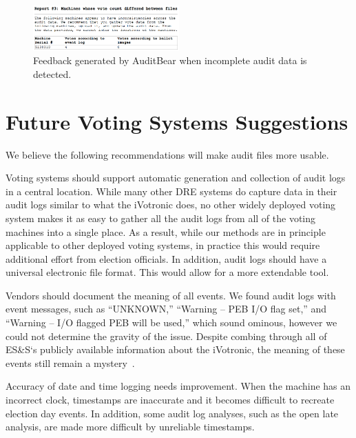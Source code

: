 \documentclass[letterpaper,twocolumn,10pt]{article}
\begin{document}
\begin{figure}[htbp]
\begin{center}
    \includegraphics[width=0.5\textwidth,height=0.2\textheight]{IncompleteAuditData.eps}
\end{center}
\caption{Feedback generated by AuditBear when incomplete audit data is detected.}
\label{fig:incomplete-audit-data}
\end{figure}

\section{Future Voting Systems Suggestions}
\label{sec:suggestions}
We believe the following recommendations will make audit files more usable. 

Voting systems should support automatic generation and collection of audit logs 
in a central location.  While many other DRE systems do capture data in their audit logs similar to what
the iVotronic does, no other widely deployed voting system makes it as easy to
gather all the audit logs from all of the voting machines into a single
place. As a result, while our methods are in principle applicable to other
deployed voting systems, in practice this would require additional effort from
election officials. 
 In addition, audit logs should have a universal 
electronic file format.  This would allow for a more extendable tool.

Vendors should document the meaning of all events. We found audit logs with
event messages, such as ``UNKNOWN,'' ``Warning – PEB I/O flag set,'' and
``Warning – I/O flagged PEB will be used,'' which sound ominous, however we
could not determine the gravity of the issue. Despite combing through all of
ES\&S`s publicly available information about the iVotronic, the meaning of these
events still remain a mystery~\cite{VerVot2011, ESS2011a, ESS2011b}. 
 
Accuracy of date and time logging needs improvement. When the machine has an
incorrect clock, timestamps are inaccurate and it becomes difficult to recreate
election day events. In addition, some audit log analyses, such as the open late
analysis, are made more difficult by unreliable timestamps. 
 
\end{document}
